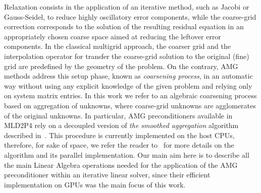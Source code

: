 Relaxation consists in the application of an iterative method, such as
Jacobi or Gauss-Seidel, to reduce highly oscillatory error components,
while the coarse-grid correction corresponds to the solution of the
resulting residual equation in an appropriately chosen coarse space
aimed at reducing the leftover error components. In the classical
multigrid approach, the coarser grid and the interpolation operator
for transfer the coarse-grid solution to the original (fine) grid are
predefined by the geometry of the problem. On the contrary, AMG
methods address this setup phase, known as \emph{coarsening process},
in an automatic way without using any explicit knowledge of the given
problem and relying only on system matrix entries. In this work we
refer to an algebraic coarsening process based on aggregation of
unknowns, where coarse-grid unknowns are agglomerates of the original
unknowns. In particular, AMG preconditioners available in MLD2P4 rely
on a decoupled version of \emph{the smoothed aggregation} algorithm
described in~\cite{BrezinaVanek96,BrezinaVanek99}. This procedure is
currently implemented on the host CPUs, therefore, for sake of space,
we refer the reader to~\cite{mld2p4-2-guide} for more details on the
algorithm and its parallel implementation. 
Our main aim here is to describe all the main Linear Algebra
operations needed for the application of the AMG preconditioner within
an iterative  linear solver, since their efficient implementation on
GPUs was the main focus of this work. 

